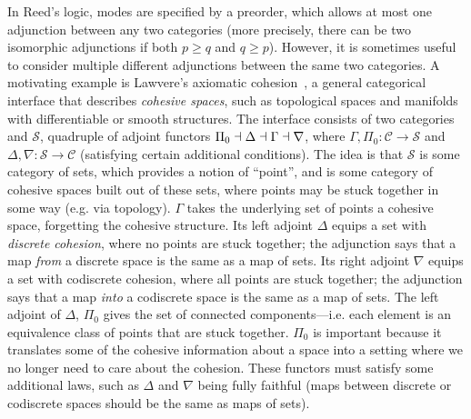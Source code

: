 \documentclass{drl-common/llncs}
\begin{document}
In Reed's logic, modes are specified by a preorder, which allows at most
one adjunction between any two categories (more precisely, there can be
two isomorphic adjunctions if both $p \ge q$ and $q \ge p$).  However,
it is sometimes useful to consider multiple different adjunctions
between the same two categories.  A motivating example is Lawvere's
axiomatic cohesion~\citep{lawvereXXcohesion}, a general categorical
interface that describes \emph{cohesive spaces}, such as topological
spaces and manifolds with differentiable or smooth structures.  The
interface consists of two categories \C and $\mathcal{S}$, quadruple of
adjoint functors $\Pi_0 \dashv \Delta \dashv \Gamma \dashv \nabla$, where
$\Gamma,\Pi_0 : \mathcal{C} \to \mathcal{S}$ and $\Delta,\nabla :
\mathcal{S} \to \mathcal{C}$ (satisfying certain additional conditions).
The idea is that $\mathcal{S}$ is some category of sets, which provides
a notion of ``point'', and \C is some category of cohesive spaces built
out of these sets, where points may be stuck together in some way
(e.g. via topology).  $\Gamma$ takes the underlying set of points a
cohesive space, forgetting the cohesive structure.  Its left adjoint
$\Delta$ equips a set with \emph{discrete cohesion}, where no points are
stuck together; the adjunction says that a map \emph{from} a discrete
space is the same as a map of sets.  Its right adjoint $\nabla$ equips a
set with codiscrete cohesion, where all points are stuck together; the
adjunction says that a map \emph{into} a codiscrete space is the same as
a map of sets.  The left adjoint of $\Delta$, $\Pi_0$ gives the set of
connected components---i.e. each element is an equivalence class of
points that are stuck together.  $\Pi_0$ is important because it
translates some of the cohesive information about a space into a setting
where we no longer need to care about the cohesion.  These functors must
satisfy some additional laws, such as $\Delta$ and $\nabla$ being fully
faithful (maps between discrete or codiscrete spaces should be the same
as maps of sets).  
\end{document}
